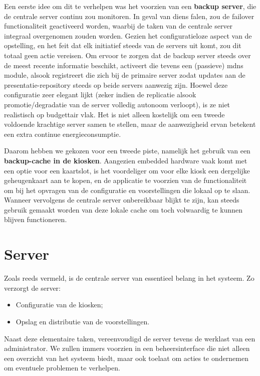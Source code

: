 Een eerste idee om dit te verhelpen was het voorzien van een \textbf{backup server}, die de centrale server continu zou monitoren. In geval van diens falen, zou de failover functionaliteit geactiveerd worden, waarbij de taken van de centrale server integraal overgenomen zouden worden. Gezien het configuratieloze aspect van de opstelling, en het feit dat elk initiatief steeds van de servers uit komt, zou dit totaal geen actie vereisen. Om ervoor te zorgen dat de backup server steeds over de meest recente informatie beschikt, activeert die tevens een (passieve) \ac{mdns} module, alsook registreert die zich bij de primaire server zodat updates aan de presentatie-repository steeds op beide servers aanwezig zijn.
Hoewel deze configuratie zeer elegant lijkt (zeker indien de replicatie alsook promotie/degradatie van de server volledig autonoom verloopt), is ze niet realistisch op budgettair vlak. Het is niet alleen kostelijk om een tweede voldoende krachtige server samen te stellen, maar de aanwezigheid ervan betekent een extra continue energieconsumptie.

Daarom hebben we gekozen voor een tweede piste, namelijk het gebruik van een \textbf{backup-cache in de kiosken}. Aangezien embedded hardware vaak komt met een optie voor een kaartslot, is het voordeliger om voor elke kiosk een dergelijke geheugenkaart aan te kopen, en de applicatie te voorzien van de functionaliteit om bij het opvragen van de configuratie en voorstellingen die lokaal op te slaan. Wanneer vervolgens de centrale server onbereikbaar blijkt te zijn, kan steeds gebruik gemaakt worden van deze lokale cache om toch volwaardig te kunnen blijven functioneren.

\section{Server}
\label{ontwerp:applicatie:server}

Zoals reeds vermeld, is de centrale server van essentieel belang in het systeem. Zo verzorgt de server:
\begin{itemize}
\item Configuratie van de kiosken;
\item Opslag en distributie van de voorstellingen.
\end{itemize}

Naast deze elementaire taken, vereenvoudigd de server tevens de werklast van een administrator. We zullen immers voorzien in een beheersinterface die niet alleen een overzicht van het systeem biedt, maar ook toelaat om acties te ondernemen om eventuele problemen te verhelpen.

